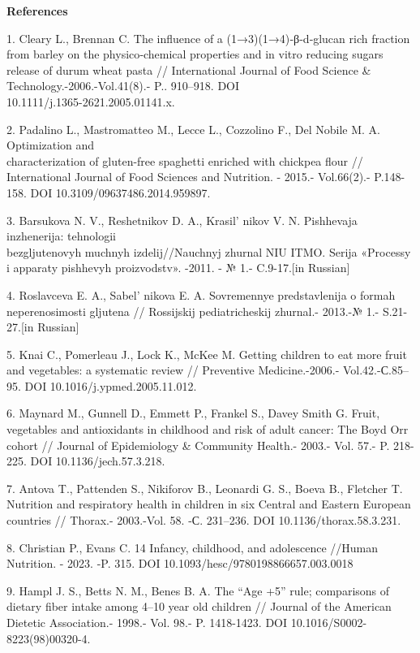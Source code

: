 \begin{center}
{\bfseries References}
\end{center}

\begin{references}
1. Cleary L., Brennan C. The influence of a (1→3)(1→4)‐β‐d‐glucan rich
fraction from barley on the physico‐chemical properties and in vitro
reducing sugars release of durum wheat pasta // International Journal of
Food Science \& Technology.-2006.-Vol.41(8).- P.. 910--918.
DOI \\10.1111/j.1365-2621.2005.01141.x.

2. Padalino L., Mastromatteo M., Lecce L., Cozzolino F., Del Nobile M.
A. Optimization and \\characterization of gluten-free spaghetti enriched
with chickpea flour // International Journal of Food Sciences and
Nutrition. - 2015.- Vol.66(2).- P.148-158.
DOI 10.3109/09637486.2014.959897.

3. Barsukova N. V., Reshetnikov D. A., Krasil' nikov V. N.
Pishhevaja inzhenerija: tehnologii \\bezgljutenovyh muchnyh
izdelij//Nauchnyj zhurnal NIU ITMO. Serija «Processy i apparaty
pishhevyh proizvodstv». -2011. - № 1.- C.9-17.{[}in Russian{]}

4. Roslavceva E. A., Sabel' nikova E. A. Sovremennye
predstavlenija o formah neperenosimosti gljutena // Rossijskij
pediatricheskij zhurnal.- 2013.-№ 1.- S.21-27.{[}in Russian{]}

5. Knai C., Pomerleau J., Lock K., McKee M. Getting children to eat more
fruit and vegetables: a systematic review // Preventive Medicine.-2006.-
Vol.42.-С.85--95. DOI 10.1016/j.ypmed.2005.11.012.

6. Maynard M., Gunnell D., Emmett P., Frankel S., Davey Smith G. Fruit,
vegetables and antioxidants in childhood and risk of adult cancer: The
Boyd Orr cohort // Journal of Epidemiology \& Community Health.- 2003.-
Vol. 57.- P. 218-225. DOI 10.1136/jech.57.3.218.

7. Antova T., Pattenden S., Nikiforov B., Leonardi G. S., Boeva B.,
Fletcher T. Nutrition and respiratory health in children in six Central
and Eastern European countries // Thorax.- 2003.-Vol. 58. -С. 231--236.
DOI 10.1136/thorax.58.3.231.

8. Christian P., Evans C. 14 Infancy, childhood, and adolescence //Human
Nutrition. - 2023. -P. 315. DOI 10.1093/hesc/9780198866657.003.0018

9. Hampl J. S., Betts N. M., Benes B. A. The ``Age +5'' rule; comparisons
of dietary fiber intake among 4--10 year old children // Journal of the
American Dietetic Association.- 1998.- Vol. 98.- P. 1418-1423. DOI
10.1016/S0002-8223(98)00320-4.


\end{references}
